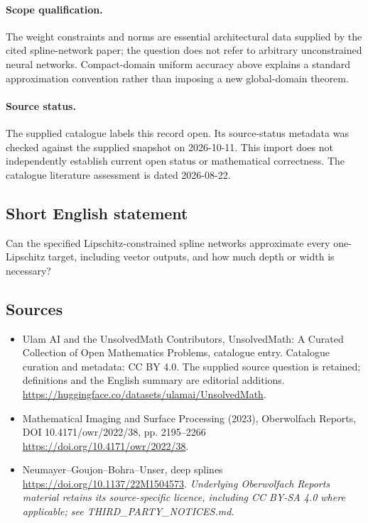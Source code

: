 \documentclass[11pt]{article}
\begin{document}
\paragraph{Scope qualification.}
The weight constraints and norms are essential architectural data supplied by the cited spline-network paper; the question does not refer to arbitrary unconstrained neural networks. Compact-domain uniform accuracy above explains a standard approximation convention rather than imposing a new global-domain theorem.
\paragraph{Source status.}
The supplied catalogue labels this record open. Its source-status metadata was checked against the supplied snapshot on 2026-10-11. This import does not independently establish current open status or mathematical correctness. The catalogue literature assessment is dated 2026-08-22.
\subsection{Short English statement}
Can the specified Lipschitz-constrained spline networks approximate every one-Lipschitz target, including vector outputs, and how much depth or width is necessary?
\subsection{Sources}
\begin{itemize}
\item[S1] Ulam AI and the UnsolvedMath Contributors, UnsolvedMath: A Curated Collection of Open Mathematics Problems, catalogue entry. Catalogue curation and metadata: CC BY 4.0. The supplied source question is retained; definitions and the English summary are editorial additions.
\url{https://huggingface.co/datasets/ulamai/UnsolvedMath}.
\item[S2] Mathematical Imaging and Surface Processing (2023), Oberwolfach Reports, DOI 10.4171/owr/2022/38, pp. 2195--2266
\url{https://doi.org/10.4171/owr/2022/38}.
\item[S3] Neumayer--Goujon--Bohra--Unser, deep splines
\url{https://doi.org/10.1137/22M1504573}.
\textit{Underlying Oberwolfach Reports material retains its source-specific licence, including CC BY-SA 4.0 where applicable; see THIRD\_PARTY\_NOTICES.md.}
\end{itemize}
\end{document}
